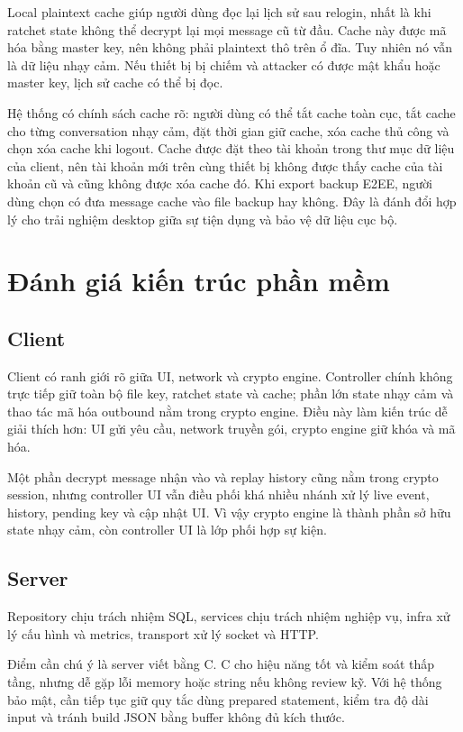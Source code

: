 Local plaintext cache giúp người dùng đọc lại lịch sử sau relogin, nhất là khi ratchet state không thể decrypt lại mọi message cũ từ đầu. Cache này được mã hóa bằng master key, nên không phải plaintext thô trên ổ đĩa. Tuy nhiên nó vẫn là dữ liệu nhạy cảm. Nếu thiết bị bị chiếm và attacker có được mật khẩu hoặc master key, lịch sử cache có thể bị đọc.

Hệ thống có chính sách cache rõ: người dùng có thể tắt cache toàn cục, tắt cache cho từng conversation nhạy cảm, đặt thời gian giữ cache, xóa cache thủ công và chọn xóa cache khi logout. Cache được đặt theo tài khoản trong thư mục dữ liệu của client, nên tài khoản mới trên cùng thiết bị không được thấy cache của tài khoản cũ và cũng không được xóa cache đó. Khi export backup E2EE, người dùng chọn có đưa message cache vào file backup hay không. Đây là đánh đổi hợp lý cho trải nghiệm desktop giữa sự tiện dụng và bảo vệ dữ liệu cục bộ.

\section{Đánh giá kiến trúc phần mềm}

\subsection{Client}

Client có ranh giới rõ giữa UI, network và crypto engine. Controller chính không trực tiếp giữ toàn bộ file key, ratchet state và cache; phần lớn state nhạy cảm và thao tác mã hóa outbound nằm trong crypto engine. Điều này làm kiến trúc dễ giải thích hơn: UI gửi yêu cầu, network truyền gói, crypto engine giữ khóa và mã hóa.

Một phần decrypt message nhận vào và replay history cũng nằm trong crypto session, nhưng controller UI vẫn điều phối khá nhiều nhánh xử lý live event, history, pending key và cập nhật UI. Vì vậy crypto engine là thành phần sở hữu state nhạy cảm, còn controller UI là lớp phối hợp sự kiện.

\subsection{Server}

Repository  chịu trách nhiệm SQL, services chịu trách nhiệm nghiệp vụ, infra xử lý cấu hình và metrics, transport xử lý socket và HTTP. 

Điểm cần chú ý là server viết bằng C. C cho hiệu năng tốt và kiểm soát thấp tầng, nhưng dễ gặp lỗi memory hoặc string nếu không review kỹ. Với hệ thống bảo mật, cần tiếp tục giữ quy tắc dùng prepared statement, kiểm tra độ dài input và tránh build JSON bằng buffer không đủ kích thước.

